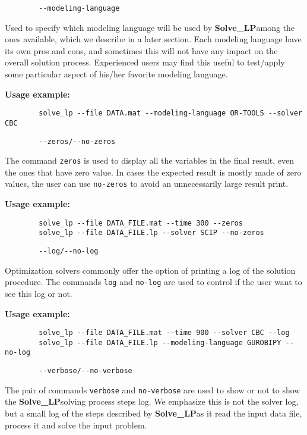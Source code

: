 \documentclass[12pt,hidelinks]{article}
\newcommand{\SolveLP}{\textbf{Solve\_LP}}
\begin{document}
	{\color{mordantred19}
	\begin{verbatim}
		--modeling-language
	\end{verbatim}
	} Used to specify which modeling language will be used by \SolveLP among the ones available, which we describe in a later section. Each modeling language have its own pros and cons, and sometimes this will not have any impact on the overall solution process. Experienced users may find this useful to test/apply some particular aspect of his/her favorite modeling language.
	
	\textbf{Usage example:} 
	\begin{verbatim}
		solve_lp --file DATA.mat --modeling-language OR-TOOLS --solver CBC
	\end{verbatim}

	{\color{mordantred19}
	\begin{verbatim}
		--zeros/--no-zeros
	\end{verbatim}
	} The command \texttt{zeros} is used to display all the variables in the final result, even the ones that have zero value. In cases the expected result is mostly made of zero values, the user can use \texttt{no-zeros} to avoid an unnecessarily large result print.
	
	\textbf{Usage example:} 
	\begin{verbatim}
		solve_lp --file DATA_FILE.mat --time 300 --zeros
		solve_lp --file DATA_FILE.lp --solver SCIP --no-zeros
	\end{verbatim}

	{\color{mordantred19}
	\begin{verbatim}
		--log/--no-log
	\end{verbatim}
	} Optimization solvers commonly offer the option of printing a log of the solution procedure. The commands \texttt{log} and \texttt{no-log} are used to control if the user want to see this log or not.
	
	\textbf{Usage example:} 
	\begin{verbatim}
		solve_lp --file DATA_FILE.mat --time 900 --solver CBC --log
		solve_lp --file DATA_FILE.lp --modeling-language GUROBIPY --no-log
	\end{verbatim}

	{\color{mordantred19}
	\begin{verbatim}
		--verbose/--no-verbose
	\end{verbatim}
	} The pair of commands \texttt{verbose} and \texttt{no-verbose} are used to show or not to show the \SolveLP solving process steps log. We emphasize this is not the solver log, but a small log of the steps described by \SolveLP as it read the input data file, process it and solve the input problem.
	
\end{document}
